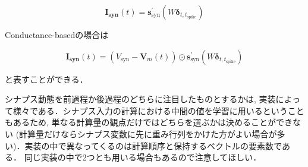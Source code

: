 \begin{equation}

\boldsymbol{I_{\text{syn}}}(t)=\boldsymbol{s}^\prime_{\text{syn}}(W\boldsymbol{\delta}_{t,t_{\text{spike}}})  

\end{equation}





Conductance-basedの場合は





\begin{equation}

\boldsymbol{I_{\text{syn}}}(t)=\left(V_{\text{syn}}-\boldsymbol{V}_{m}(t)\right)\odot \boldsymbol{s}^\prime_{\text{syn}}(W\boldsymbol{\delta}_{t,t_{\text{spike}}})

\end{equation}





と表すことができる．



シナプス動態を前過程か後過程のどちらに注目したものとするかは, 実装によって様々である．シナプス入力の計算における中間の値を学習に用いるということもあるため, 単なる計算量の観点だけではどちらを選ぶかは決めることができない (計算量だけならシナプス変数に先に重み行列をかけた方がよい場合が多い)．実装の中で異なってくるのは計算順序と保持するベクトルの要素数である． 同じ実装の中で2つとも用いる場合もあるので注意してほしい．

